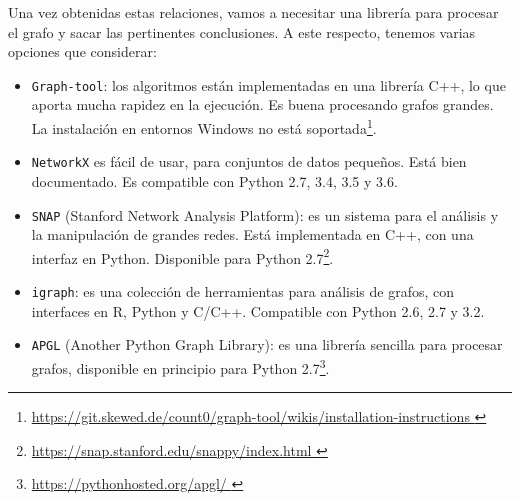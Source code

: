 Una vez obtenidas estas relaciones, vamos a necesitar una librería 
para procesar el grafo y sacar las pertinentes 
conclusiones. A este respecto, tenemos varias opciones que considerar:
\begin{itemize}
\item {\tt Graph-tool}: los algoritmos están implementadas en una librería C++, 
lo que aporta mucha rapidez en la ejecución. Es 
buena procesando grafos grandes. La instalación en entornos Windows no
está soportada\footnote{\url{https://git.skewed.de/count0/graph-tool/wikis/installation-instructions 
}}.
\item {\tt NetworkX} es fácil de usar, para conjuntos de datos pequeños. Está bien
documentado. Es compatible con Python 2.7, 3.4, 3.5 y 3.6.
\item {\tt SNAP} (Stanford Network Analysis Platform): es un sistema para el análisis
y la manipulación de grandes redes. Está implementada en C++, con una interfaz en Python. 
Disponible para Python 2.7\footnote{\url{https://snap.stanford.edu/snappy/index.html }}.
\item {\tt igraph}: es una colección de herramientas para análisis de grafos,
con interfaces en R, Python y C/C++. Compatible con Python 2.6, 2.7 y 3.2.
\item {\tt APGL} (Another Python Graph Library): es una librería sencilla
para procesar grafos, disponible en principio para Python 2.7\footnote{\url{https://pythonhosted.org/apgl/ }}.
\end{itemize}

